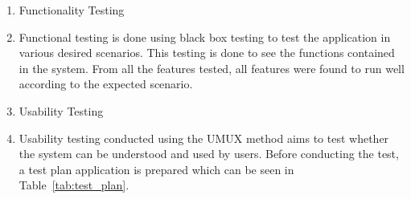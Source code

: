 \documentclass[conference,a4paper]{IEEEtran}
\begin{document}
\begin{enumerate}[label=\alph*.]
  \item Functionality Testing
  \item [] Functional testing is done using black box testing to test the application in various desired scenarios. This testing is done to see the functions contained in the system. From all the features tested, all features were found to run well according to the expected scenario.

  \item Usability Testing
  \item [] Usability testing conducted using the UMUX method aims to test whether the system can be understood and used by users. Before conducting the test, a test plan application is prepared which can be seen in Table~\ref{tab:test_plan}.


\end{enumerate}
\end{document}
